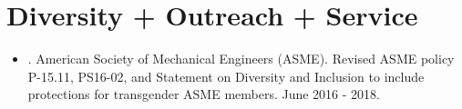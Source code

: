 \documentclass[letterpaper]{deedy-resume} %
\begin{document}
{%
%
%
%
%
%
%


\section{Diversity + Outreach + Service}

\vspace{0.2cm}


\begin{itemize}

\item {.} American Society of Mechanical Engineers (ASME). Revised ASME policy P-15.11, PS16-02, and Statement on Diversity and Inclusion to include protections for transgender ASME members. June 2016 - 2018.


\end{itemize}}
\end{document}
